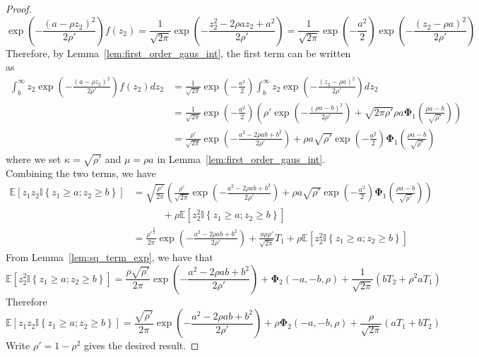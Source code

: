 \documentclass[10pt]{article} %
\theoremstyle{definition}
\theoremstyle{plain}
\newcommand{\paren}[1]{\left(#1\right)}
\newcommand{\indy}[1]{\mathbb{I}\left\{#1\right\}}
\providecommand{\E}{\mathbb{E}}
\begin{document}
\begin{proof}
\[        \exp\paren{-\frac{\paren{a - \rho z_2}^2}{2\rho'}}f\paren{z_2} = \frac{1}{\sqrt{2\pi}}\exp\paren{-\frac{z_2^2 - 2\rho az_2 + a^2}{2\rho'}} = \frac{1}{\sqrt{2\pi}}\exp\paren{-\frac{a^2}{2}}\exp\paren{-\frac{\paren{z_2-\rho a}^2}{2\rho'}}
    \]
    Therefore, by Lemma~\ref{lem:first_order_gaus_int}, the first term can be written as
    \begin{align*}
        \int_b^\infty z_2\exp\paren{-\frac{\paren{a - \rho z_2}^2}{2\rho'}}f\paren{z_2}dz_2 & = \frac{1}{\sqrt{2\pi}}\exp\paren{-\frac{a^2}{2}}\int_b^\infty z_2\exp\paren{-\frac{\paren{z_2-\rho a}^2}{2\rho'}}dz_2\\
        & = \frac{1}{\sqrt{2\pi}}\exp\paren{-\frac{a^2}{2}}\paren{\rho'\exp\paren{-\frac{\paren{\rho a- b}^2}{2\rho'}} + \sqrt{2\pi\rho'}\rho a\bm{\Phi}_1\paren{\frac{\rho a - b}{\sqrt{\rho'}}}}\\
        & = \frac{\rho'}{\sqrt{2\pi}}\exp\paren{-\frac{a^2-2\rho ab + b^2}{2\rho'}} + \rho a\sqrt{\rho'}\exp\paren{-\frac{a^2}{2}}\bm{\Phi}_1\paren{\frac{\rho a - b}{\sqrt{\rho'}}}
    \end{align*}
    where we set $\kappa=\sqrt{\rho'}$ and $\mu = \rho a$ in Lemma~\ref{lem:first_order_gaus_int}. Combining the two terms, we have
    \begin{align*}
        \E\left[z_1z_2\indy{z_1\geq a;z_2\geq b}\right] & = \sqrt{\frac{\rho'}{2\pi}}\paren{\frac{\rho'}{\sqrt{2\pi}}\exp\paren{-\frac{a^2-2\rho ab + b^2}{2\rho'}} + \rho a\sqrt{\rho'}\exp\paren{-\frac{a^2}{2}}\bm{\Phi}_1\paren{\frac{\rho a - b}{\sqrt{\rho'}}}}\\
        &\quad\quad\quad + \rho \E\left[z_2^2\indy{z_1\geq a;z_2\geq b}\right]\\
        & = \frac{\rho'^{\frac{3}{2}}}{2\pi}\exp\paren{-\frac{a^2-2\rho ab + b^2}{2\rho'}} + \frac{a\rho\rho'}{\sqrt{2\pi}}T_1 +  \rho \E\left[z_2^2\indy{z_1\geq a;z_2\geq b}\right]
    \end{align*}
    From Lemma~\ref{lem:sq_term_exp}, we have that
    \[
        \E\left[z_2^2\indy{z_1\geq a; z_2\geq b}\right] = \frac{\rho\sqrt{\rho'}}{2\pi}\exp\paren{-\frac{a^2 - 2\rho ab + b^2}{2\rho'}} + \bm{\Phi}_2\paren{-a,-b,\rho} + \frac{1}{\sqrt{2\pi}}\paren{bT_2 + \rho^2 aT_1}
    \]
    Therefore
    \[
        \E\left[z_1z_2\indy{z_1\geq a;z_2\geq b}\right] = \frac{\sqrt{\rho'}}{2\pi}\exp\paren{-\frac{a^2 - 2\rho ab + b^2}{2\rho'}} + \rho\bm{\Phi}_2\paren{-a,-b,\rho} + \frac{\rho}{\sqrt{2\pi}}\paren{aT_1 + bT_2}
    \]
    Write $\rho' = 1-\rho^2$ gives the desired result.
\end{proof}
\end{document}
